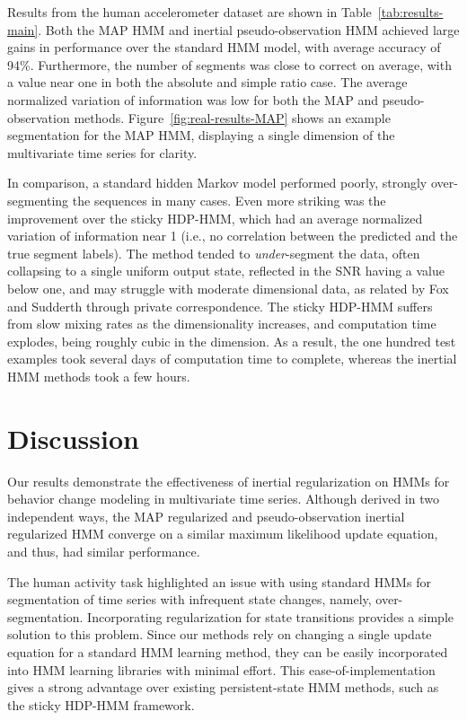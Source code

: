 \documentclass[letterpaper]{article}
\begin{document}
Results from the human accelerometer dataset are shown in
Table~\ref{tab:results-main}. Both the MAP HMM and inertial pseudo-observation
HMM achieved large gains in performance over the standard HMM model, with
average accuracy of 94\%. Furthermore, the number of segments was close to
correct on average, with a value near one in both the absolute and simple ratio
case. The average normalized variation of information was low for both the MAP and pseudo-observation methods.
Figure~\ref{fig:real-results-MAP} shows an example segmentation for the MAP HMM, displaying a single dimension of the
multivariate time series for clarity.

In comparison, a standard hidden Markov model performed poorly, strongly over-segmenting the 
sequences in many cases. Even more striking was the improvement over the sticky HDP-HMM, which 
had an average normalized variation of information near 1 (i.e., no correlation between
the predicted and the true segment labels). The method tended to
\emph{under}-segment the data, often collapsing to a single uniform output state, reflected in the SNR 
having a value below one, and may struggle with moderate dimensional data, as related by Fox and 
Sudderth through private correspondence. The sticky HDP-HMM suffers from slow mixing rates as the
dimensionality increases, and computation time explodes, being roughly cubic in
the dimension. As a result, the one hundred test examples took several days of
computation time to complete, whereas the inertial HMM methods took a few hours.

\section{Discussion}

Our results demonstrate the effectiveness of inertial regularization on HMMs for
behavior change modeling in multivariate time series. Although derived in two
independent ways, the MAP regularized and pseudo-observation inertial regularized HMM converge on a
similar maximum likelihood update equation, and thus, had similar performance.

The human activity task highlighted an issue with using standard HMMs for
segmentation of time series with infrequent state changes, namely,
over-segmentation. Incorporating regularization for state transitions provides a
simple solution to this problem. Since our methods rely on changing a single
update equation for a standard HMM learning method, they can be easily
incorporated into HMM learning libraries with minimal effort. This
ease-of-implementation gives a strong advantage over existing persistent-state
HMM methods, such as the sticky HDP-HMM framework.
\end{document}
